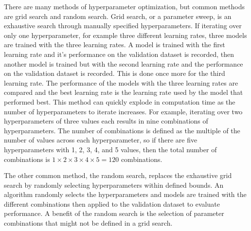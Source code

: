 There are many methods of hyperparameter optimization, but common methods are grid search and random search. Grid search, or a parameter sweep, is an exhaustive search through manually specified hyperparameters. If iterating over only one hyperparameter, for example three different learning rates, three models are trained with the three learning rates. A model is trained with the first learning rate and it's performance on the validation dataset is recorded, then another model is trained but with the second learning rate and the performance on the validation dataset is recorded. This is done once more for the third learning rate. The performance of the models with the three learning rates are compared and the best learning rate is the learning rate used by the model that performed best. This method can quickly explode in computation time as the number of hyperparameters to iterate increases. For example, iterating over two hyperparameters of three values each results in nine combinations of hyperparameters. The number of combinations is defined as the multiple of the number of values across each hyperparameter, so if there are five hyperparameters with 1, 2, 3, 4, and 5 values, then the total number of combinations is $1 \times 2 \times 3 \times 4 \times 5 = 120$ combinations.

The other common method, the random search, replaces the exhaustive grid search by randomly selecting hyperparameters within defined bounds. An algorithm randomly selects the hyperparameters and models are trained with the different combinations then applied to the validation dataset to evaluate performance. A benefit of the random search is the selection of parameter combinations that might not be defined in a grid search.

